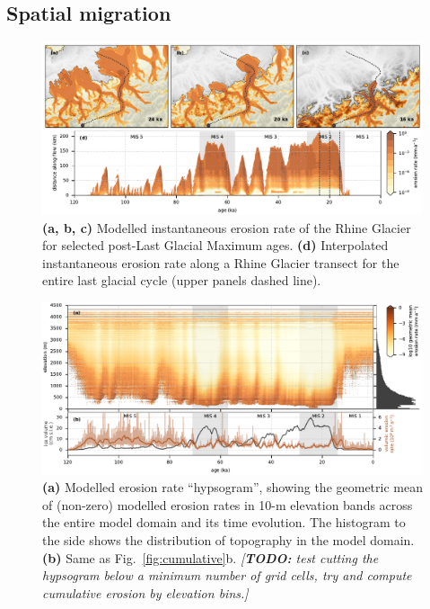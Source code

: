 \documentclass[esurf, manuscript]{copernicus}
\newcommand{\todo}[1]{\textcolor{Rd}{\emph{[\textbf{TODO:} #1]}}}
\begin{document}
\subsection{Spatial migration}

    \begin{figure}
      \centerline{\includegraphics{alpero_transects}}
      \caption{%
        \textbf{(a, b, c)} Modelled instantaneous erosion rate of the Rhine
          Glacier for selected post-Last Glacial Maximum ages.
        \textbf{(d)} Interpolated instantaneous erosion rate along a Rhine
          Glacier transect for the entire last glacial cycle (upper panels
          dashed line).}
      \label{fig:transects}
    \end{figure}

    \begin{figure}
      \centerline{\includegraphics{alpero_hypsogram}}
      \caption{%
        \textbf{(a)} Modelled erosion rate ``hypsogram'', showing the geometric
          mean of (non-zero) modelled erosion rates in 10-m elevation bands
          across the entire model domain and its time evolution. The histogram
          to the side shows the distribution of topography in the model domain.
        \textbf{(b)} Same as Fig.~\ref{fig:cumulative}b.
      \todo{%
        test cutting the hypsogram below a minimum number of grid cells,
        try and compute cumulative erosion by elevation bins.}}
      \label{fig:hypsogram}
    \end{figure}
\end{document}
